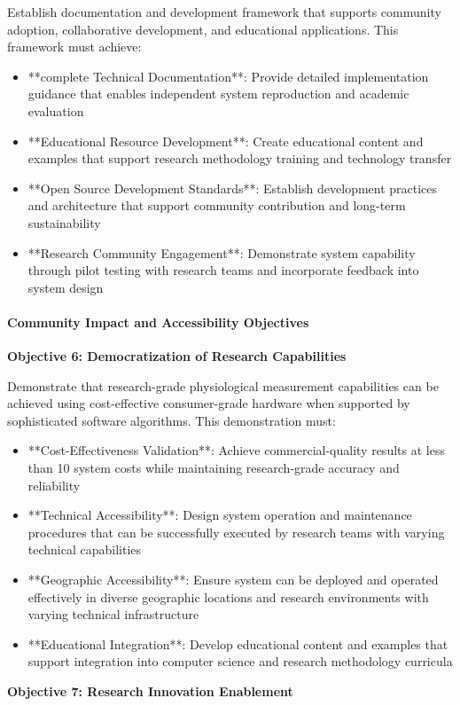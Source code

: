 \documentclass[11pt,a4paper]{article}
\begin{document}
Establish documentation and development framework that supports community adoption,
collaborative development, and
educational applications. This framework must achieve:

\begin{itemize}
\item **complete Technical Documentation**: Provide detailed implementation guidance that enables independent system
  reproduction and academic evaluation
\item **Educational Resource Development**: Create educational content and examples that support research methodology
  training and technology transfer
\item **Open Source Development Standards**: Establish development practices and architecture that support community
  contribution and long-term sustainability
\item **Research Community Engagement**: Demonstrate system capability through pilot testing with research teams and
  incorporate feedback into system design

\end{itemize}
\paragraph{Community Impact and Accessibility Objectives}

\textbf{Objective 6: Democratization of Research Capabilities}

Demonstrate that research-grade physiological measurement capabilities can be
achieved using cost-effective
consumer-grade hardware when supported by sophisticated software algorithms.  This
demonstration must:

\begin{itemize}
\item **Cost-Effectiveness Validation**: Achieve commercial-quality results at less than 10%
  system costs while maintaining research-grade accuracy and reliability
\item **Technical Accessibility**: Design system operation and maintenance procedures that can be successfully executed by
  research teams with varying technical capabilities
\item **Geographic Accessibility**: Ensure system can be deployed and operated effectively in diverse geographic locations
  and research environments with varying technical infrastructure
\item **Educational Integration**: Develop educational content and examples that support integration into computer science
  and research methodology curricula

\end{itemize}
\textbf{Objective 7: Research Innovation Enablement}
\end{document}
